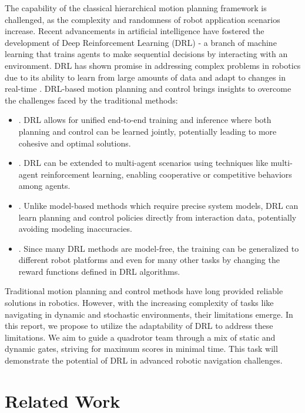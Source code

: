 \documentclass[letterpaper,journal,twoside]{IEEEtran}
\begin{document}
The capability of the 
classical hierarchical motion planning framework is 
challenged, 
as the complexity and randomness of robot application 
scenarios increase. 
Recent advancements in artificial intelligence have fostered 
the development of Deep Reinforcement Learning (DRL) - a branch 
of machine learning that trains agents to make sequential 
decisions by interacting with an environment. DRL has shown 
promise in addressing complex problems in robotics 
due to its ability to learn from large 
amounts of data and adapt to changes in real-time
\cite{lee2020learning,hwangbo2017control,gu2017deep}.
DRL-based motion planning and control brings insights to 
overcome the challenges faced by the traditional methods: 
\begin{itemize}
  \item {}. DRL allows for unified end-to-end 
  training and inference where both planning and control can be 
  learned 
  jointly, potentially leading to more cohesive and optimal 
  solutions.
  \item {}.  DRL can be 
  extended to multi-agent scenarios using techniques like 
  multi-agent reinforcement learning, enabling cooperative or 
  competitive behaviors among agents.
  \item {}. Unlike model-based methods which 
  require precise system models, DRL can learn planning and  
  control policies directly from interaction data, potentially  
  avoiding modeling inaccuracies.
  \item {}. Since many DRL methods are 
  model-free, the training can be generalized to different 
  robot platforms and even for many other tasks by changing 
  the reward functions defined in DRL algorithms.
\end{itemize}


Traditional motion planning and control methods have long 
provided 
reliable solutions in robotics. 
However, with the increasing complexity of tasks like navigating in dynamic and stochastic environments, their 
limitations emerge. 
In this report, we propose to utilize the
adaptability of DRL to address 
these limitations. 
We aim to guide a quadrotor team through a mix of static 
and dynamic gates, striving for maximum scores in minimal time. 
This task will demonstrate the potential of DRL in advanced 
robotic navigation challenges.



\section{Related Work}
\end{document}
